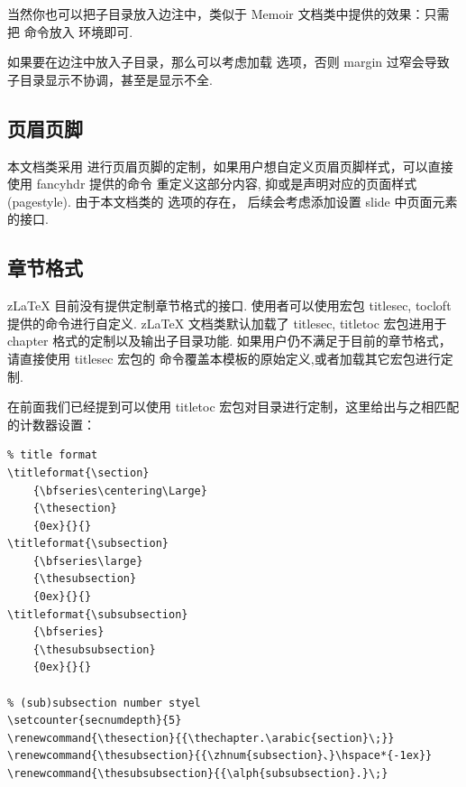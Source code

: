 当然你也可以把子目录放入边注中，类似于 Memoir 文档类中提供的效果：只需把 \cmd{\partialToc} 命令放入 \cmd{\marginpar} 环境即可.

\begin{remark}
如果要在边注中放入子目录，那么可以考虑加载  选项，否则 margin 过窄会导致子目录显示不协调，甚至是显示不全.
\end{remark}

\subsection{页眉页脚}
本文档类采用  进行页眉页脚的定制，如果用户想自定义页眉页脚样式，可以直接使用 fancyhdr 提供的命令
\cmd{\fancyhead, \fancyfoot} 重定义这部分内容, 抑或是声明对应的页面样式(pagestyle). 由于本文档类的  选项的存在，
后续会考虑添加设置 slide 中页面元素的接口.

\subsection{章节格式}\label{counter-settings}
z\LaTeX{} 目前没有提供定制章节格式的接口. 使用者可以使用宏包 {titlesec, tocloft} 提供的命令进行自定义. z\LaTeX{}
文档类默认加载了 {titlesec, titletoc} 宏包进用于 chapter 格式的定制以及输出子目录功能. 如果用户仍不满足于目前的章节格式，
请直接使用 {titlesec} 宏包的 \cmd{\titleformat} 命令覆盖本模板的原始定义,或者加载其它宏包进行定制. 

在前面我们已经提到可以使用 {titletoc} 宏包对目录进行定制，这里给出与之相匹配的计数器设置：
\begin{verbatim}
% title format
\titleformat{\section}
    {\bfseries\centering\Large}
    {\thesection}
    {0ex}{}{}
\titleformat{\subsection}
    {\bfseries\large}
    {\thesubsection}
    {0ex}{}{}
\titleformat{\subsubsection}
    {\bfseries}
    {\thesubsubsection}
    {0ex}{}{}

% (sub)subsection number styel
\setcounter{secnumdepth}{5}
\renewcommand{\thesection}{{\thechapter.\arabic{section}\;}}
\renewcommand{\thesubsection}{{\zhnum{subsection}、}\hspace*{-1ex}}
\renewcommand{\thesubsubsection}{{\alph{subsubsection}.}\;}
\end{verbatim}

